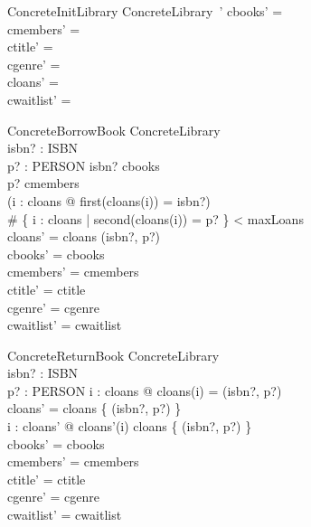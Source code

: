 \documentclass{article}
\begin{document}
\begin{schema}{ConcreteInitLibrary}
  ConcreteLibrary~'
\where
  cbooks' = \langle \rangle \\
  cmembers' = \langle \rangle \\
  ctitle' = \langle \rangle \\
  cgenre' = \langle \rangle \\
  cloans' = \langle \rangle \\
  cwaitlist' = \langle \rangle
\end{schema}

\begin{schema}{ConcreteBorrowBook}
  \Delta ConcreteLibrary \\
  isbn? : ISBN \\
  p? : PERSON
\where
  isbn? \in \ran cbooks \\
  p? \in \ran cmembers \\
  \lnot (\exists i : \dom cloans @ first(cloans(i)) = isbn?) \\
  \# \{ i : \dom cloans | second(cloans(i)) = p? \} < maxLoans \\
  cloans' = cloans \cat \langle (isbn?, p?) \rangle \\
  cbooks' = cbooks \\
  cmembers' = cmembers \\
  ctitle' = ctitle \\
  cgenre' = cgenre \\
  cwaitlist' = cwaitlist
\end{schema}

\begin{schema}{ConcreteReturnBook}
  \Delta ConcreteLibrary \\
  isbn? : ISBN \\
  p? : PERSON
\where
  \exists i : \dom cloans @ cloans(i) = (isbn?, p?) \\
  \ran cloans' = \ran cloans \setminus \{ (isbn?, p?) \} \\
  \forall i : \dom cloans' @ cloans'(i) \in \ran cloans \setminus \{ (isbn?, p?) \} \\
  cbooks' = cbooks \\
  cmembers' = cmembers \\
  ctitle' = ctitle \\
  cgenre' = cgenre \\
  cwaitlist' = cwaitlist
\end{schema}
\end{document}
